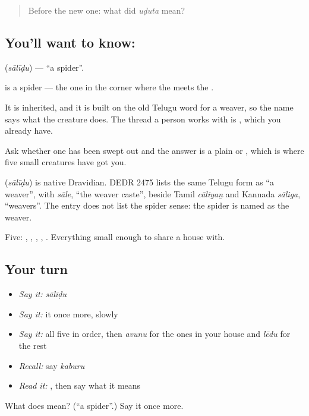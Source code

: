 \label{lesson:TE-C70-spider}



\begin{quote}
Before the new one: what did \emph{uḍuta} mean?
\end{quote}

\subsection*{You'll want to know: }
\textbf{} (\emph{sālīḍu}) — \textquotedblleft{}a spider\textquotedblright{}.

 is a spider — the one in the corner where the  meets the .

It is inherited, and it is built on the old Telugu word for a weaver, so the name says what the creature does. The thread a person works with is , which you already have.

Ask whether one has been swept out and the answer is a plain  or , which is where five small creatures have got you.

\begin{cousinweb}
\textbf{} (\emph{sālīḍu}) is native Dravidian. DEDR 2475 lists the same Telugu form as \textquotedblleft{}a weaver\textquotedblright{}, with \emph{sāle}, \textquotedblleft{}the weaver caste\textquotedblright{}, beside Tamil \emph{cāliyaṉ} and Kannada \emph{sāliga}, \textquotedblleft{}weavers\textquotedblright{}. The entry does not list the spider sense: the spider is named as the weaver.
\end{cousinweb}

\begin{grammarlens}[title={What you've built}]
Five: , , , , . Everything small enough to share a house with.
\end{grammarlens}

\subsection*{Your turn}
\begin{itemize}
\raggedright
  \item \emph{Say it:} \emph{sālīḍu}
  \item \emph{Say it:} it once more, slowly
  \item \emph{Say it:} all five in order, then \emph{avunu} for the ones in your house and \emph{lēdu} for the rest
  \item \emph{Recall:} say \emph{kaburu}
  \item \emph{Read it:} \textbf{}, then say what it means
\end{itemize}

\begin{tcolorbox}[breakable,colback=teal!4,colframe=teal!35!black,title={Before you move on}]
What does  mean? (\textquotedblleft{}a spider\textquotedblright{}.) Say it once more.
\end{tcolorbox}
